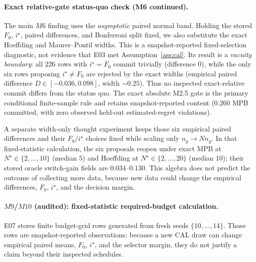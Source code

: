 \documentclass{article}
\begin{document}
\paragraph{Exact relative-gate status-quo check (M6 continued).}
The main $M6$ finding uses the \emph{asymptotic} paired normal band. Holding the stored
$F_0$, $i^\star$, paired differences, and Bonferroni split fixed, we also substitute the
exact Hoeffding and Maurer--Pontil widths. This is a snapshot-reported fixed-selection
diagnostic, not evidence that E03 met Assumption~\ref{ass:cal}. Its result is a
\emph{vacuity boundary}: all $226$ rows with $i^\star{=}F_0$ commit trivially (difference
$0$), while the only six rows proposing $i^\star\ne F_0$ are rejected by the exact widths
(empirical paired difference $D\!\in\![-0.036,0.098]$, width $\sim0.25$). Thus no inspected
exact-relative commit differs from the status quo. The exact absolute M2.5 gate is the primary
conditional finite-sample rule and retains snapshot-reported content ($0.260$ MPB committed,
with zero observed held-out estimated-regret violations).

A separate width-only thought experiment keeps those six empirical paired differences and
their $F_0/i^\star$ choices fixed while scaling only $n_g\!\to\!Nn_g$. In that
fixed-statistic calculation, the six proposals reopen under exact MPB at
$N^\star\!\in\!\{2,\dots,10\}$ (median $5$) and Hoeffding at
$N^\star\!\in\!\{2,\dots,20\}$ (median $10$); their stored oracle switch-gain fields are
$0.034$--$0.130$. This algebra does not predict the outcome of collecting more data, because
new data could change the empirical differences, $F_0$, $i^\star$, and the decision margin.

\paragraph{$M9$/$M10$ (audited): fixed-statistic required-budget calculation.}
E07 stores finite budget-grid rows generated from fresh seeds $\{10,\dots,14\}$. Those
rows are snapshot-reported observations; because a new CAL draw can change empirical paired
means, $F_0$, $i^\star$, and the selector margin, they do not justify a claim beyond their
inspected schedules.
\end{document}
